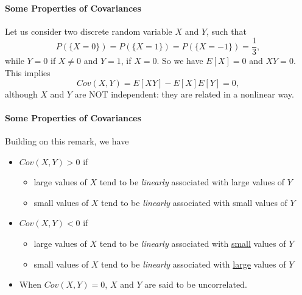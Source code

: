 \documentclass[notes=show,handout]{beamer}\usepackage[]{graphicx}\usepackage[]{color}
\newenvironment{stepitemize}{\begin{itemize}[<+->]}{\end{itemize} }
\begin{document}
\begin{frame}{\secname}
  \framesubtitle{Some Properties of Covariances}
  \begin{example}
  \begin{footnotesize}
  Let us consider two discrete random variable $X$ and $Y$, such that
  $$
  P(\{X=0\})=P(\{X=1\})=P(\{X=-1\})=\frac{1}{3},
  $$
  while $Y=0$ if $X\neq 0$ and $Y=1$, if $X=0$. So we have $E[X]=0$ and $XY=0$. This implies
  $$
  Cov(X,Y) = E[XY] -E[X]E[Y] =0,
  $$
  although $X$ and $Y$ are NOT independent: they are related in a nonlinear way.
  \end{footnotesize}
  \end{example}

\end{frame}

\begin{frame}{\secname}
  \framesubtitle{Some Properties of Covariances}

  Building on this remark, we have

  \begin{stepitemize}

  \item
  \color{black}%
  $Cov(X,Y)>0$ if
  \begin{stepitemize}
  \item large values of $X$ tend to be \emph{linearly }associated with large
  values of $Y$
  \item small values of $X$ tend to be \emph{linearly }associated with small
  values of $Y$\bigskip
  \end{stepitemize}
  \item $Cov(X,Y)<0$ if
  \begin{stepitemize}
  \item large values of $X$ tend to be \emph{linearly }associated with
  \underline{small} values of $Y$
  \item small values of $X$ tend to be \emph{linearly }associated with
  \underline{large} values of $Y$\bigskip
  \end{stepitemize}
  \item When $Cov(X,Y)=0$, $X$ and $Y$ are said to be uncorrelated.
  \end{stepitemize}
\end{frame}
\end{document}
